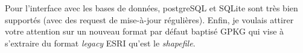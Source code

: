\documentclass[a4paper, 11pt]{article}
\begin{document}
  Pour l'interface avec les bases de données, postgreSQL et SQLite sont très bien supportés (avec des request de mise-à-jour régulières). Enfin, je voulais attirer votre attention sur un nouveau format par défaut baptisé GPKG qui vise à s'extraire du format \textit{legacy} ESRI qu'est le \textit{shapefile}.
  \begin{figure} %
  \centering
    \\

\end{figure}
\end{document}
